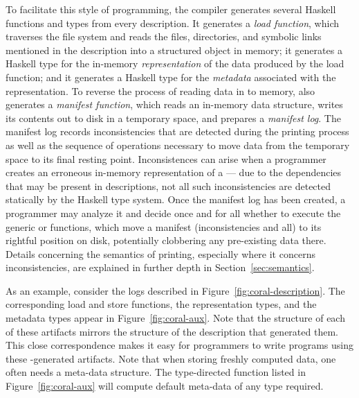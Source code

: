 To facilitate this style of programming, the \forest{} compiler
generates several Haskell functions and types from every \forest{}
description.  It generates a \emph{load function}, which traverses the
file system and reads the files, directories, and symbolic links
mentioned in the description into a structured object in memory; 
it
generates a Haskell type for the in-memory \emph{representation} of
the data produced by the load function; and it generates a Haskell
type for the \emph{metadata} associated with the representation. 
To reverse the process of reading data in to memory, \forest{}
also generates a \emph{manifest function}, which reads an in-memory
data structure, writes its contents out to disk in a temporary
space, and prepares a 
\emph{manifest log}.  The manifest log records inconsistencies
that are detected during the printing process as well as the sequence
of operations necessary to move data from the temporary space to
its final resting point.  Inconsistences
can arise when a programmer creates an erroneous in-memory
representation of a \filestore{}
--- due to the dependencies that may be present in
\forest{} descriptions, not all such inconsistencies 
are detected statically by the Haskell type system.
Once the manifest log has been created, a programmer may analyze it
and decide once and for all whether to execute the 
generic  or 
functions, which move a manifest (inconsistencies and all) to its 
rightful position on disk, potentially clobbering any pre-existing data 
there.  Details concerning the semantics of printing, 
especially where it concerns inconsistencies,
are explained in further depth in Section~\ref{sec:semantics}.

As an example, consider the \coral{} logs described in
Figure~\ref{fig:coral-description}.  The corresponding load and store
functions, the representation types, and the metadata types appear in
Figure~\ref{fig:coral-aux}. Note that the structure of each of these
artifacts mirrors the structure of the \forest{}
description that generated them. This close correspondence makes it
easy for programmers to write programs using these \forest{}-generated artifacts.
Note that when storing freshly computed data, one often needs
a meta-data structure.  The type-directed function 
listed in Figure~\ref{fig:coral-aux} will compute default meta-data
of any type required.

